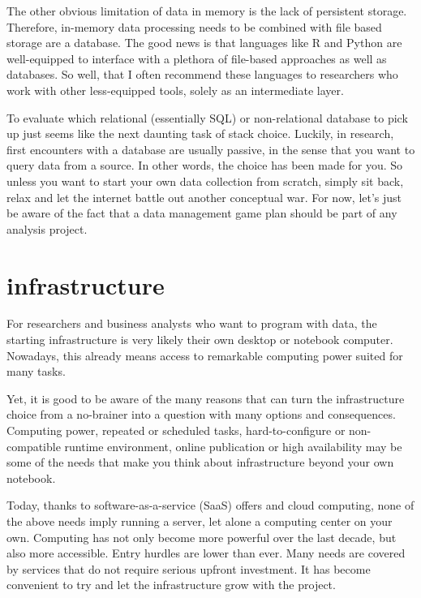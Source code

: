 \documentclass[
  12pt,
  letterpaper,
]{krantz}
\begin{document}
The other obvious limitation of data in memory is the lack of persistent
storage. Therefore, in-memory data processing needs to be combined with
file based storage are a database. The good news is that
languages like R and Python are well-equipped to interface with a
plethora of file-based approaches as well as databases.
So well, that I often recommend these languages to researchers who work
with other less-equipped tools, solely as an intermediate layer.

To evaluate which relational (essentially SQL) or non-relational
database to pick up just seems like the next daunting
task of stack choice. Luckily, in research, first
encounters with a database are usually passive, in the
sense that you want to query data from a source. In other words, the
choice has been made for you. So unless you want to start your own data
collection from scratch, simply sit back, relax and let the internet
battle out another conceptual war. For now, let's just be aware of the
fact that a data management game plan should be part of any analysis
project.

\hypertarget{infrastructure}{%
\section{\texorpdfstring{infrastructure}{infrastructure}}\label{infrastructure}}

For researchers and business analysts who want to program with data, the
starting infrastructure is very likely their own
desktop or notebook computer. Nowadays, this already means access to
remarkable computing power suited for many tasks.

Yet, it is good to be aware of the many reasons that can turn the
infrastructure choice from a no-brainer into a
question with many options and consequences. Computing power, repeated
or scheduled tasks, hard-to-configure or non-compatible runtime
environment, online publication or high availability may be some of the
needs that make you think about infrastructure
beyond your own notebook.

Today, thanks to software-as-a-service (SaaS) offers and cloud
computing, none of the above needs imply running a server, let alone a
computing center on your own. Computing has not only become more
powerful over the last decade, but also more accessible. Entry hurdles
are lower than ever. Many needs are covered by services that do not
require serious upfront investment. It has become convenient to try and
let the infrastructure grow with the project.
\end{document}
